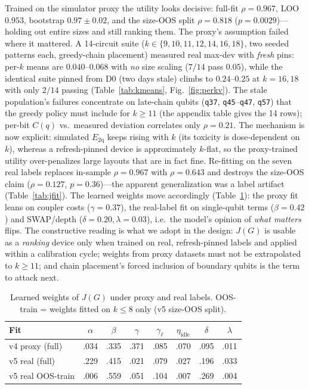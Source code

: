 \documentclass[journal,10pt,twocolumn]{IEEEtran}
\newcommand{\q}[1]{\texttt{q#1}}
\begin{document}
Trained on the simulator proxy the utility looks decisive: full-fit $\rho{=}0.967$, LOO $0.953$, bootstrap
$0.97{\pm}0.02$, and the size-OOS split $\rho{=}0.818$ ($p{=}0.0029$)---holding out entire sizes and still ranking
them. The proxy's assumption failed where it mattered. A 14-circuit suite
($k\in\{9,10,11,12,14,16,18\}$, two seeded patterns each, greedy-chain placement) measured real max-dev with
\emph{fresh} pins: per-$k$ means are $0.040$--$0.068$ with \emph{no} size scaling ($7/14$ pass $0.05$), while the
identical suite pinned from D0 (two days stale) climbs to $0.24$--$0.25$ at $k{=}16,18$ with only $2/14$ passing
(Table~\ref{tab:kmeans}, Fig.~\ref{fig:perkv}). The stale population's failures concentrate on late-chain qubits
(\q{37}, \q{45}--\q{47}, \q{57}) that the greedy policy must include for $k\ge11$ (the appendix table gives the
14 rows); per-bit $C(q)$ vs.\ measured deviation correlates only $\rho{=}0.21$. The mechanism is now explicit:
simulated $E_{\mathrm{2q}}$ keeps rising with $k$ (its toxicity is dose-dependent on $k$), whereas a refresh-pinned
device is approximately $k$-flat, so the proxy-trained utility over-penalizes large layouts that are in fact fine.
Re-fitting on the seven real labels replaces in-sample $\rho{=}0.967$ with $\rho{=}0.643$ and destroys the
size-OOS claim ($\rho{=}0.127$, $p{=}0.36$)---the apparent generalization was a label artifact
(Table~\ref{tab:jfit}). The learned weights move accordingly (Table~\ref{tab:wgts}): the proxy fit leans on coupler
costs ($\gamma{=}0.37$), the real-label fit on single-qubit terms ($\beta{=}0.42$) and SWAP/depth
($\delta{=}0.20,\lambda{=}0.03$), i.e.\ the model's opinion of \emph{what matters} flips. The constructive reading is
what we adopt in the design: $J(G)$ is usable as a \emph{ranking} device only when trained on real, refresh-pinned
labels and applied within a calibration cycle; weights from proxy datasets must not be extrapolated to $k\ge11$;
and chain placement's forced inclusion of boundary qubits is the term to attack next.

\begin{table}[t]
\caption{Learned weights of $J(G)$ under proxy and real labels. OOS-train = weights fitted on $k\le8$ only
(v5 size-OOS split).}
\label{tab:wgts}
\centering
\footnotesize
\setlength{\tabcolsep}{3pt}
\begin{tabular}{@{}lccccccc@{}}
\toprule
Fit & $\alpha$ & $\beta$ & $\gamma$ & $\gamma_{\ell}$ & $\eta_{\mathrm{idle}}$ & $\delta$ & $\lambda$\\
\midrule
v4 proxy (full) & .034 & .335 & .371 & .085 & .070 & .095 & .011\\
v5 real (full)  & .229 & .415 & .021 & .079 & .027 & .196 & .033\\
v5 real OOS-train & .006 & .559 & .051 & .104 & .007 & .269 & .004\\
\bottomrule
\end{tabular}
\end{table}
\end{document}
